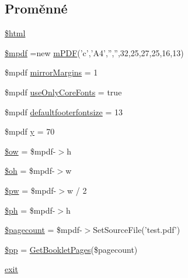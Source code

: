 \subsection*{Proměnné}
\begin{DoxyCompactItemize}
\item 
\hyperlink{example43___m_p_d_f_i__booklet_8php_a6f96e7fc92441776c9d1cd3386663b40}{\$html}
\item 
\hyperlink{example43___m_p_d_f_i__booklet_8php_ad028f81910d6cbab9b184d2214b3a8f8}{\$mpdf} =new \hyperlink{classm_p_d_f}{m\-P\-D\-F}('c','A4','','',32,25,27,25,16,13)
\item 
\$mpdf \hyperlink{example43___m_p_d_f_i__booklet_8php_a24c284cb7774410f65953584ea1fd9c1}{mirror\-Margins} = 1
\item 
\$mpdf \hyperlink{example43___m_p_d_f_i__booklet_8php_af2f1fce5e41ebb499bcff9cc6f865a19}{use\-Only\-Core\-Fonts} = true
\item 
\$mpdf \hyperlink{example43___m_p_d_f_i__booklet_8php_af908f917e35d865734d31eecf6841116}{defaultfooterfontsize} = 13
\item 
\$mpdf \hyperlink{example43___m_p_d_f_i__booklet_8php_a3f83be162d14f38451e1bc419fbbbcbc}{y} = 70
\item 
\hyperlink{example43___m_p_d_f_i__booklet_8php_a07c2862e5c638968feec8053b50abae5}{\$ow} = \$mpdf-\/$>$h
\item 
\hyperlink{example43___m_p_d_f_i__booklet_8php_ab09fc7575b29981b0adffe6e400fdd8e}{\$oh} = \$mpdf-\/$>$w
\item 
\hyperlink{example43___m_p_d_f_i__booklet_8php_a4a84bb9d73addd9e90f2f34c36035df4}{\$pw} = \$mpdf-\/$>$w / 2
\item 
\hyperlink{example43___m_p_d_f_i__booklet_8php_ac1d420fcdb8b362b7909b4f257c9b916}{\$ph} = \$mpdf-\/$>$h
\item 
\hyperlink{example43___m_p_d_f_i__booklet_8php_a905390c82ddf2d57cc0c524f4e5b0425}{\$pagecount} = \$mpdf-\/$>$Set\-Source\-File('test.\-pdf')
\item 
\hyperlink{example43___m_p_d_f_i__booklet_8php_afdc7058c7adc87561bca9d538b13632e}{\$pp} = \hyperlink{example43___m_p_d_f_i__booklet_8php_a1b9720554576ed902f1b644fbdf6ce8f}{Get\-Booklet\-Pages}(\$pagecount)
\item 
\hyperlink{example43___m_p_d_f_i__booklet_8php_a6733eb5f605d09eaede9845835d71c4e}{exit}
\end{DoxyCompactItemize}


